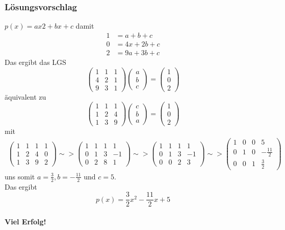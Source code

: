 \documentclass[a4paper,11pt]{scrartcl}
\begin{document}
\subsubsection*{Lösungsvorschlag}
$p(x)=ax2+bx+c$ damit
\begin{align*}
1&=a+b+c\\
0&=4x+2b+c\\
2&=9a+3b+c
\end{align*}
Das ergibt das LGS
$$
\begin{pmatrix} 1&1&1 \\ 4 & 2 & 1\\ 9&3&1 \end{pmatrix}\begin{pmatrix}a\\b\\c\end{pmatrix}=\begin{pmatrix} 1\\0\\2 \end{pmatrix}
$$
äquivalent zu
$$
\begin{pmatrix} 1&1&1 \\ 1&2&4\\ 1&3&9 \end{pmatrix}\begin{pmatrix}c\\b\\a\end{pmatrix}=\begin{pmatrix} 1\\0\\2 \end{pmatrix}
$$
mit 
\begin{align*}
\left( \begin{array}{ccc|c} 1&1&1&1\\ 1&2&4&0\\1&3&9&2 \end{array}\right) \sim> \left( \begin{array}{ccc|c} 1&1&1&1\\ 0&1&3&-1\\0&2&8&1 \end{array} \right) \sim> \left( \begin{array}{ccc|c} 1&1&1&1\\ 0&1&3&-1\\0&0&2&3 \end{array} \right) \sim> \left( \begin{array}{ccc|c} 1&0&0&5\\ 0&1&0&-\frac{11}{2}\\0&0&1&\frac{3}{2} \end{array} \right)
\end{align*}
uns somit $a=\frac{3}{2},b=-\frac{11}{2}$ und $c=5$.\\
Das ergibt
$$
p(x)=\frac{3}{2}x^2-\frac{11}{2}x+5
$$
\quad\\

\vfill \hfill \textbf{Viel Erfolg!}
\end{document}
